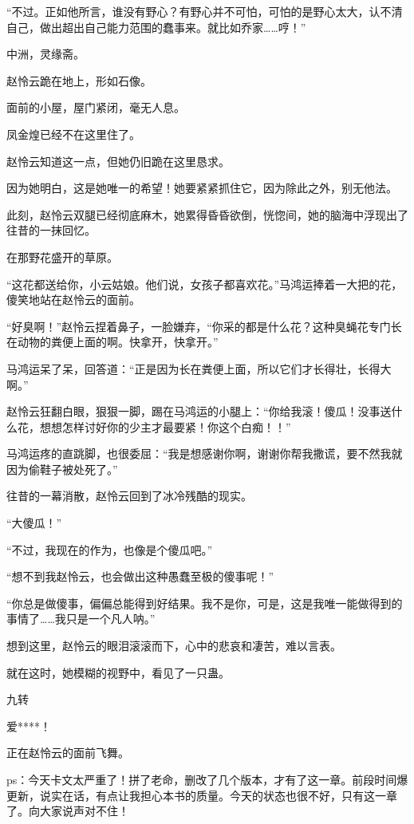 \begin{this_body}
“不过。正如他所言，谁没有野心？有野心并不可怕，可怕的是野心太大，认不清自己，做出超出自己能力范围的蠢事来。就比如乔家……哼！”

中洲，灵缘斋。

赵怜云跪在地上，形如石像。

面前的小屋，屋门紧闭，毫无人息。

凤金煌已经不在这里住了。

赵怜云知道这一点，但她仍旧跪在这里恳求。

因为她明白，这是她唯一的希望！她要紧紧抓住它，因为除此之外，别无他法。

此刻，赵怜云双腿已经彻底麻木，她累得昏昏欲倒，恍惚间，她的脑海中浮现出了往昔的一抹回忆。

在那野花盛开的草原。

“这花都送给你，小云姑娘。他们说，女孩子都喜欢花。”马鸿运捧着一大把的花，傻笑地站在赵怜云的面前。

“好臭啊！”赵怜云捏着鼻子，一脸嫌弃，“你采的都是什么花？这种臭蝇花专门长在动物的粪便上面的啊。快拿开，快拿开。”

马鸿运呆了呆，回答道：“正是因为长在粪便上面，所以它们才长得壮，长得大啊。”

赵怜云狂翻白眼，狠狠一脚，踢在马鸿运的小腿上：“你给我滚！傻瓜！没事送什么花，想想怎样讨好你的少主才最要紧！你这个白痴！！”

马鸿运疼的直跳脚，也很委屈：“我是想感谢你啊，谢谢你帮我撒谎，要不然我就因为偷鞋子被处死了。”

往昔的一幕消散，赵怜云回到了冰冷残酷的现实。

“大傻瓜！”

“不过，我现在的作为，也像是个傻瓜吧。”

“想不到我赵怜云，也会做出这种愚蠢至极的傻事呢！”

“你总是做傻事，偏偏总能得到好结果。我不是你，可是，这是我唯一能做得到的事情了……我只是一个凡人呐。”

想到这里，赵怜云的眼泪滚滚而下，心中的悲哀和凄苦，难以言表。

就在这时，她模糊的视野中，看见了一只蛊。

九转

爱****！

正在赵怜云的面前飞舞。

ps：今天卡文太严重了！拼了老命，删改了几个版本，才有了这一章。前段时间爆更新，说实在话，有点让我担心本书的质量。今天的状态也很不好，只有这一章了。向大家说声对不住！

\end{this_body}

